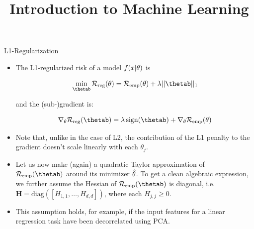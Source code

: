 



\newcommand{\titlefigure}{figure_man/L1-regul01.png}
\newcommand{\learninggoals}{
  \item Have a geometric understanding of L1-regularization
  \item Understand geometrically how L1-regularization induces sparsity
}

\title{Introduction to Machine Learning}
\date{}




\begin{vbframe} {L1-Regularization}
  

  \begin{itemize}
    \item The L1-regularized risk of a model $f(x | \theta)$ is

      \[
      \min_{\thetab} \riskrt = \risket + \lambda ||\thetab||_1
      \] 
      
      and the (sub-)gradient is:
      
      $$\nabla_{\theta} \mathcal{R}_{\text{reg}}(\thetab) = \lambda \sign(\thetab) + \nabla_{\theta} \risket$$

    \item Note that, unlike in the case of L2, the contribution of the L1 penalty to the gradient doesn't scale linearly with each $\theta_j$. 
    \item Let us now make (again) a quadratic Taylor approximation of $\mathcal{R}_{\text{emp}}(\thetab)$ around its minimizer $\hat{\theta}$. To get a clean algebraic expression, we further assume the Hessian of $\mathcal{R}_{\text{emp}}(\thetab)$ is diagonal, i.e. $\bm{H} = \text{diag}([H_{1,1}, \ldots , H_{d,d}])$, where each $H_{j,j} \geq 0$.
    \item This assumption holds, for example, if the input features for a linear regression task have been decorrelated using PCA.
  \end{itemize}
  
  \framebreak
  

\end{vbframe}
